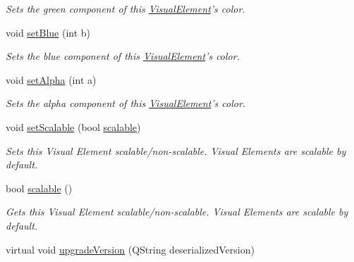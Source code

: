 \begin{DoxyCompactItemize}
\begin{DoxyCompactList}\small\item\em Sets the green component of this \hyperlink{struct_picto_1_1_visual_element}{Visual\-Element}'s color. \end{DoxyCompactList}\item 
\hypertarget{struct_picto_1_1_visual_element_af6e98ee100236e0161f7c8336a29420c}{void \hyperlink{struct_picto_1_1_visual_element_af6e98ee100236e0161f7c8336a29420c}{set\-Blue} (int b)}\label{struct_picto_1_1_visual_element_af6e98ee100236e0161f7c8336a29420c}

\begin{DoxyCompactList}\small\item\em Sets the blue component of this \hyperlink{struct_picto_1_1_visual_element}{Visual\-Element}'s color. \end{DoxyCompactList}\item 
\hypertarget{struct_picto_1_1_visual_element_ad67ec9ed73dba09cc396470935ca6332}{void \hyperlink{struct_picto_1_1_visual_element_ad67ec9ed73dba09cc396470935ca6332}{set\-Alpha} (int a)}\label{struct_picto_1_1_visual_element_ad67ec9ed73dba09cc396470935ca6332}

\begin{DoxyCompactList}\small\item\em Sets the alpha component of this \hyperlink{struct_picto_1_1_visual_element}{Visual\-Element}'s color. \end{DoxyCompactList}\item 
void \hyperlink{struct_picto_1_1_visual_element_a068aefd4d7927229d627add5f56e1b87}{set\-Scalable} (bool \hyperlink{struct_picto_1_1_visual_element_a43bd78b6352d017f0716db97a2c1bc2c}{scalable})
\begin{DoxyCompactList}\small\item\em Sets this Visual Element scalable/non-\/scalable. Visual Elements are scalable by default. \end{DoxyCompactList}\item 
bool \hyperlink{struct_picto_1_1_visual_element_a43bd78b6352d017f0716db97a2c1bc2c}{scalable} ()
\begin{DoxyCompactList}\small\item\em Gets this Visual Element scalable/non-\/scalable. Visual Elements are scalable by default. \end{DoxyCompactList}\item 
virtual void \hyperlink{struct_picto_1_1_visual_element_a0e38e859761d1fd7c6285cb2c82f2704}{upgrade\-Version} (Q\-String deserialized\-Version)
\end{DoxyCompactItemize}
